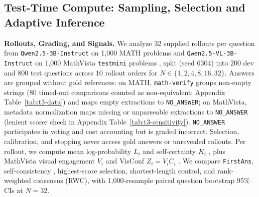 \documentclass{article}
\begin{document}
\subsection{Test-Time Compute: Sampling, Selection and Adaptive Inference}
\label{sec:setup-ttc}

\textbf{Rollouts, Grading, and Signals.} We analyze 32 supplied rollouts per question from \texttt{Qwen2.5-\allowbreak 3B-\allowbreak Instruct} \citep{qwen25} on 1,000 MATH problems \citep{hendrycks2021math} and \texttt{Qwen2.5-\allowbreak VL-\allowbreak 3B-\allowbreak Instruct} \citep{bai2025qwen25vl} on 1,000 MathVista \texttt{testmini} problems \citep{lu2024mathvista}, split (seed 6304) into 200 dev and 800 test questions across 10 rollout orders for $N \in \{1, 2, 4, 8, 16, 32\}$. Answers are grouped without gold references: on MATH, \texttt{math-verify} \citep{mathverify} groups non-empty strings (80 timed-out comparisons counted as non-equivalent; Appendix Table~\ref{tab:t3-data}) and maps empty extractions to \texttt{NO\_ANSWER}; on MathVista, metadata normalization maps missing or unparseable extractions to \texttt{NO\_ANSWER} (lenient scorer check in Appendix Table~\ref{tab:t3-sensitivity}). \texttt{NO\_ANSWER} participates in voting and cost accounting but is graded incorrect. Selection, calibration, and stopping never access gold answers or unrevealed rollouts. Per rollout, we compute mean log-probability $L_i$ and self-certainty $K_i$ \citep{kang2025selfcertainty}, plus MathVista visual engagement $V_i$ and VisConf $Z_i = V_i C_i$ \citep{usman2026visconf}. We compare \texttt{FirstAns}, self-consistency \citep{wang2023selfconsistency}, highest-score selection, shortest-length control, and rank-weighted consensus (RWC), with 1,000-resample paired question bootstrap 95\% CIs at $N=32$.
\end{document}

